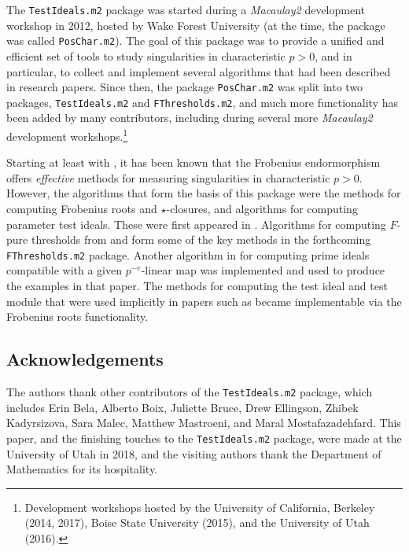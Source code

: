 \documentclass[11pt]{amsart}
\begin{document}
The {\tt TestIdeals.m2} package was started during a \emph{Macaulay2} development workshop in 2012, hosted by Wake Forest University (at the time, the package was called {\tt PosChar.m2}).  The goal of this package was to provide a unified and efficient set of tools to study singularities in characteristic $p > 0$, and in particular, to collect and implement several algorithms that had been described in research papers.  Since then, the package {\tt PosChar.m2} was split into two packages, {\tt TestIdeals.m2} and {\tt FThresholds.m2}, and
much more functionality has been added by many contributors, including during several more \emph{Macaulay2} development workshops.\footnote{Development workshops hosted by the University of California, Berkeley (2014, 2017), Boise State University (2015), and the University of Utah (2016).}

Starting at least with \cite{FedderFPureRat}, it has been known that the Frobenius endormorphism offers \emph{effective} methods for measuring singularities in characteristic $p > 0$.  However, the algorithms that form the basis of this package were the methods for computing Frobenius roots and $\star$-closures, and algorithms for computing parameter test ideals.  These were first appeared in \cite{KatzmanParameterTestIdealOfCMRings,BlickleMustataSmithDiscretenessAndRationalityOfFThresholds,BlickleMustataSmithFThresholdsOfHypersurfaces,KatzmanFrobeniusMapsOnInjectiveHulls}. Algorithms for computing $F$-pure thresholds from \cite{HernandezFInvariantsOfDiagonalHyp} and \cite{HernandezFPureThresholdOfBinomial} form some of the key methods in the forthcoming {\tt FThresholds.m2} package.
Another algorithm in \cite{KatzmanSchwedeAlgorithm} for computing prime ideals compatible with a given $p^{-e}$-linear map was implemented and used to produce the examples in that paper.  The methods for computing the test ideal and test module that were used implicitly in papers such as \cite{BlickleSchwedeTakagiZhang,KatzmanLyubeznikZhangOnDiscretenessAndRationality,SchwedeTuckerTestIdealFiniteMaps} became implementable via the Frobenius roots functionality.




\subsection*{Acknowledgements}
The authors thank other contributors of the {\tt TestIdeals.m2} package, which includes
Erin Bela, Alberto Boix, Juliette Bruce, Drew Ellingson, Zhibek Kadyrsizova, Sara Malec, Matthew Mastroeni, and Maral Mostafazadehfard.
This paper, and the finishing touches to the {\tt TestIdeals.m2} package, were made at the University of Utah in 2018, and the visiting authors thank the Department of Mathematics for its hospitality.
\end{document}
